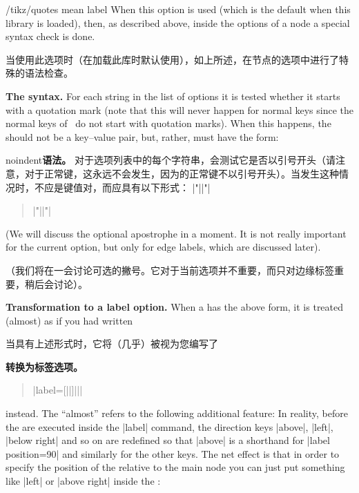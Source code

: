 \begin{key}{/tikz/quotes mean label}
    When this option is used (which is the default when this library is
    loaded), then, as described above, inside the options of a node a special
    syntax check is done.

    当使用此选项时（在加载此库时默认使用），如上所述，在节点的选项中进行了特殊的语法检查。

    \medskip
    \noindent\textbf{The syntax.}
    For each string in the list of options it is tested whether it starts with
    a quotation mark (note that this will never happen for normal keys since
    the normal keys of \tikzname\ do not start with quotation marks). When this
    happens, the  should not be a key--value pair, but, rather,
    must have the form:
    
    noindent\textbf{语法。}
对于选项列表中的每个字符串，会测试它是否以引号开头（请注意，对于正常键，这永远不会发生，因为\tikzname 的正常键不以引号开头）。当发生这种情况时，不应是键值对，而应具有以下形式：
|"||"|
    \begin{quote}
        |"||"|
    \end{quote}

    (We will discuss the optional apostrophe in a moment. It is not really
    important for the current option, but only for edge labels, which are
    discussed later).

    （我们将在一会讨论可选的撇号。它对于当前选项并不重要，而只对边缘标签重要，稍后会讨论）。

    \medskip
    \noindent\textbf{Transformation to a label option.}
    When a  has the above form, it is treated (almost) as if you
    had written

    当具有上述形式时，它将（几乎）被视为您编写了

    \noindent\textbf{转换为标签选项。}
    \begin{quote}
        |label={[||]||}|
    \end{quote}
    instead. The ``almost'' refers to the following additional feature: In
    reality, before the  are executed inside the |label| command,
    the direction keys |above|, |left|, |below right| and so on are redefined
    so that |above| is a shorthand for |label position=90| and similarly for
    the other keys. The net effect is that in order to specify the position of
    the  relative to the main node you can just put something like
    |left| or |above right| inside the :
    

\end{key}
